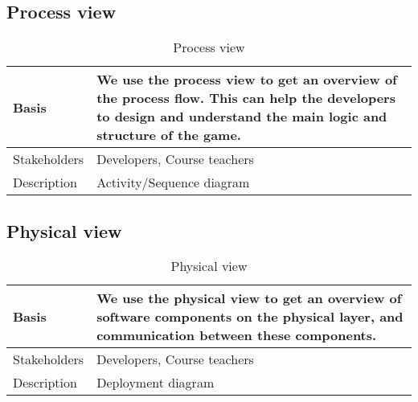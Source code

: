 \vspace{-20pt}

\subsection{Process view}

\begin{table}[h!]
\begin{tabular}{ | p{90pt} | p{270pt}  |}
\hline
Basis	 & We use the process view to get an overview of the process flow. This can help the developers to design and understand the main logic and structure of the game. \\ \hline
Stakeholders & Developers, Course teachers\\ \hline 
Description & Activity/Sequence diagram \\ \hline


\end{tabular}

\caption{Process view}

\end{table}

\vspace{-20pt}

\pagebreak
\subsection{Physical view}

\begin{table}[h!]
\begin{tabular}{ | p{90pt} | p{270pt}  |}
\hline
Basis	 & We use the physical view to get an overview of software components on the physical layer, and communication between these components.  \\ \hline
Stakeholders & Developers, Course teachers\\ \hline 
Description & Deployment diagram \\ \hline


\end{tabular}

\caption{Physical view}

\end{table}

\vspace{-20pt}







